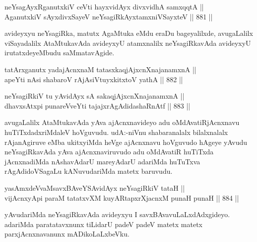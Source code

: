 \begin{shl}
neYsagAyxRganutxkiV ceVti hayxvidAyx divxvidhA samxqqtA || \\
AganutxkiV sAyxdivxSayeV neYsagiRkAyxtamxniVSayxteV \hfill || 881 ||  
\end{shl}

\begin{artha}
avideyxyu neYsagiRka, matutx AgaMtuka eMdu eraDu bageyalilxde, avugaLalilx viSayadalilx AtaMtukavAda avideyxyU atamxnalilx neYsagiRkavAda avideyxyU irutatxdeyeMbudu saMmatavAgide.
\end{artha}


\begin{shl}
tatArx\s \s ganutx yadajAcnxnaM tatasxkaqjAjxcnXnajanamxnA || \\
apeYti nAsi shabaroV rAjA\s siVtuyxkitxtoV yathA \hfill || 882 ||  
\end{shl}
				
\begin{shl}
neYsagiRkiV tu yA\s vidAyx sA sakaqjAjxcnXnajanamxnA || \\
dhavxsAtx\s pi punareVveYti tajajxrAgAdidashaRnAtf \hfill || 883 ||  
\end{shl}

\begin{artha}
avugaLalilx AtaMtukavAda yAva ajAcnxnavideyo adu oMdAvatiRjAcnxnavu huTiTxdadxriMdaleV hoVguvudu. udA:-niVnu shabaranalalx bilalxnalalx rAjanAgiruve eMba ukitxyiMda heVge ajAcnxnavu hoVguvudo hAgeye yAvudu neYsagiRkavAda yAva ajAcnxnaviruvudo adu oMdAvatiR huTiTxda jAcnxnadiMda nAshavAdarU mareyAdarU adariMda huTuTxva rAgAdidoVSagaLu kANuvudariMda matetx baruvudu.
\end{artha}


\begin{shl}
yasAmxdeVvaMsavxBAveYSA\s vidAyx neYsagiRkiV tataH || \\
vijAcnxyApi paraM tatatxvXM kuyARtapxrXjacnxM punaH punaH \hfill || 884 ||  
\end{shl}

\begin{artha}
yAvudariMda neYsagiRkavAda avideyxyu I savxBAvavuLaLxdAdxgideyo. adariMda paratatavxnunx tiLidarU padeV padeV matetx matetx parxjAcnxnavanunx mADikoLaLxbeVku.
\end{artha}

